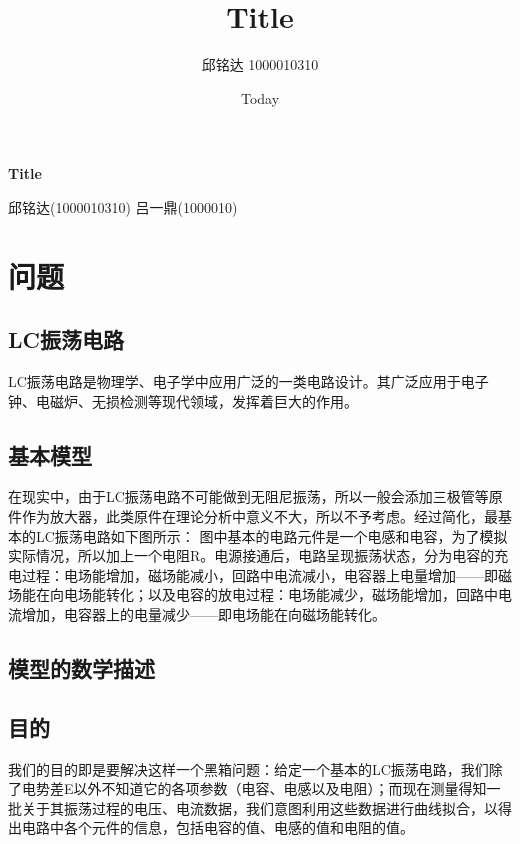 \documentclass[a4paper]{article}
\begin{document}
\title{Title}
\author{邱铭达 1000010310}
\date{Today}

%
%
\begin{center}
	\Huge \textbf{Title}
\end{center}
\vspace{1 in}
\begin{center}
	\normalsize 邱铭达(1000010310) 吕一鼎(1000010)
\end{center}
\newpage


\tableofcontents

\section{问题}

\subsection{LC振荡电路}
	LC振荡电路是物理学、电子学中应用广泛的一类电路设计。其广泛应用于电子钟、电磁炉、无损检测等现代领域，发挥着巨大的作用。
\subsection{基本模型}
	在现实中，由于LC振荡电路不可能做到无阻尼振荡，所以一般会添加三极管等原件作为放大器，此类原件在理论分析中意义不大，所以不予考虑。经过简化，最基本的LC振荡电路如下图所示： 图中基本的电路元件是一个电感和电容，为了模拟实际情况，所以加上一个电阻R。电源接通后，电路呈现振荡状态，分为电容的充电过程：电场能增加，磁场能减小，回路中电流减小，电容器上电量增加——即磁场能在向电场能转化；以及电容的放电过程：电场能减少，磁场能增加，回路中电流增加，电容器上的电量减少——即电场能在向磁场能转化。
\subsection{模型的数学描述}

\subsection{目的}

	我们的目的即是要解决这样一个黑箱问题：给定一个基本的LC振荡电路，我们除了电势差E以外不知道它的各项参数（电容、电感以及电阻）；而现在测量得知一批关于其振荡过程的电压、电流数据，我们意图利用这些数据进行曲线拟合，以得出电路中各个元件的信息，包括电容的值、电感的值和电阻的值。
\end{document}
